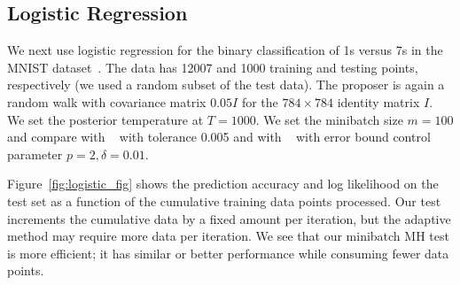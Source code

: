 \documentclass{article}
\begin{document}
\subsection{Logistic Regression}\label{ssec:logistic}

We next use logistic regression for the binary classification of 1s versus 7s in the MNIST
dataset~\cite{lecun-mnisthandwrittendigit-2010}. The data has 12007 and 1000 training and testing
points, respectively (we used a random subset of the test data). The proposer is again a random walk
with covariance matrix $0.05I$ for the $784\times 784$ identity matrix $I$. We set the posterior
temperature at $T=1000$. We set the minibatch size $m=100$ and compare with ~\cite{cutting_mh_2014} with
tolerance 0.005 and with ~\cite{icml2014c1_bardenet14} with error bound control parameter $p = 2, \delta = 0.01$.

Figure~\ref{fig:logistic_fig} shows the prediction accuracy and log likelihood on the test set as a
function of the cumulative training data points processed. Our test increments the cumulative data
by a fixed amount per iteration, but the adaptive method may require more data per iteration.  We
see that our minibatch MH test is more efficient; it has similar or better performance while
consuming fewer data points.
\end{document}
